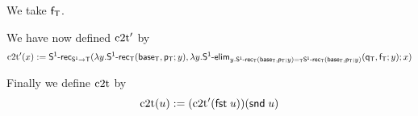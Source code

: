 We take $\fT$.

We have now defined $\ctot'$ by
\[\ctot'(x):=\dsd{S^1\text{-}rec}_{\dsd{S^1}\to\dsd{T}}
(\lambda{}y.\dsd{S^1\text{-}rec}_{\dsd{T}}(\baseT,\pT;y),
\lambda{}y.\dsd{S^1\text{-}elim}_{y.\homj{\dsd{T}}
  {\dsd{S^1\text{-}rec}_{\dsd{T}}(\baseT,\pT;y)}
  {\dsd{S^1\text{-}rec}_{\dsd{T}}(\baseT,\pT;y)}}(\qT,\fT;y);x)\]

Finally we define $\ctot$ by
\[\ctot(u):=(\ctot'(\fst u))(\snd u)\]

